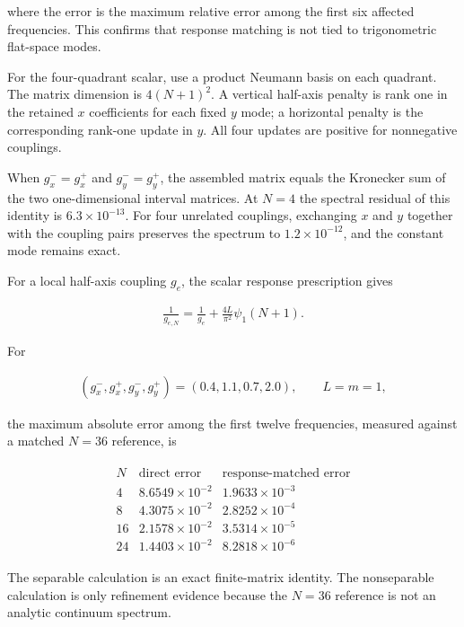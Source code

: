 where the error is the maximum relative error among the first six affected frequencies. This confirms that response matching is not tied to trigonometric flat-space modes.

For the four-quadrant scalar, use a product Neumann basis on each quadrant. The matrix dimension is $4(N+1)^2$. A vertical half-axis penalty is rank one in the retained $x$ coefficients for each fixed $y$ mode; a horizontal penalty is the corresponding rank-one update in $y$. All four updates are positive for nonnegative couplings.

When $g_x^-=g_x^+$ and $g_y^-=g_y^+$, the assembled matrix equals the Kronecker sum of the two one-dimensional interval matrices. At $N=4$ the spectral residual of this identity is $6.3\times10^{-13}$. For four unrelated couplings, exchanging $x$ and $y$ together with the coupling pairs preserves the spectrum to $1.2\times10^{-12}$, and the constant mode remains exact.

For a local half-axis coupling $g_e$, the scalar response prescription gives

\begin{align}
\frac1{g_{e,N}}
=\frac1{g_e}
+\frac{4L}{\pi^2}\psi_1(N+1).
\end{align}

For

\begin{align}
(g_x^-,g_x^+,g_y^-,g_y^+)=(0.4,1.1,0.7,2.0),
\qquad L=m=1,
\end{align}

the maximum absolute error among the first twelve frequencies, measured against a matched $N=36$ reference, is

\begin{align}
\begin{array}{c|cc}
N & \text{direct error} & \text{response-matched error} \\ \hline
4  & 8.6549\times10^{-2} & 1.9633\times10^{-3} \\
8  & 4.3075\times10^{-2} & 2.8252\times10^{-4} \\
16 & 2.1578\times10^{-2} & 3.5314\times10^{-5} \\
24 & 1.4403\times10^{-2} & 8.2818\times10^{-6}
\end{array}
\end{align}

The separable calculation is an exact finite-matrix identity. The nonseparable calculation is only refinement evidence because the $N=36$ reference is not an analytic continuum spectrum.

